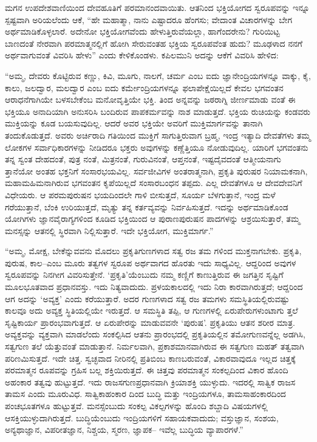 ಮಗನ ಉಪದೇಶವಾಣಿಯಿಂದ ದೇವಹೂತಿಗೆ ಪರಮಾನಂದವಾಯಿತು. ಆತನಿಂದ ಭಕ್ತಿಯೋಗದ ಸ್ವರೂಪವನ್ನು ಇನ್ನೂ ಸ್ಪಷ್ಟವಾಗಿ ಅರಿಯಲೆಂದು ಆಕೆ, “ಹೇ ಮಹಾತ್ಮಾ, ನಾನು ಎಷ್ಟಾದರೂ ಹೆಂಗಸು; ವೇದಾಂತ ವಿಚಾರಗಳನ್ನು ಬೇಗ ಅರ್ಥಮಾಡಿಕೊಳ್ಳಲಾರೆ. ಅದೇನೋ ಭಕ್ತಿಯೋಗವೆಂದು ಹೇಳುತ್ತಿರುವೆಯಲ್ಲಾ, ಹಾಗೆಂದರೇನು? ಗುರಿಯಿಟ್ಟ ಬಾಣದಂತೆ ನೇರವಾಗಿ ಪರಮಾತ್ಮನಲ್ಲಿಗೆ ಹೋಗಿ ಸೇರುವಂತಹ ಭಕ್ತಿಯ ಸ್ವರೂಪವೆಂತ ಹುದು? ಮೂಢಳಾದ ನನಗೆ ಅರ್ಥವಾಗುವಂತೆ ವಿವರಿಸಿ ಹೇಳು” ಎಂದು ಕೇಳಿಕೊಂಡಳು. ಕಪಿಲಮುನಿ ಅದನ್ನು ಆಕೆಗೆ ವಿವರಿಸಿ ಹೇಳಿದ:

“ಅಮ್ಮ, ದೇವರು ಕೊಟ್ಟಿರುವ ಕಣ್ಣು, ಕಿವಿ, ಮೂಗು, ನಾಲಗೆ, ಚರ್ಮ ಎಂಬ ಐದು ಜ್ಞಾನೇಂದ್ರಿಯಗಳನ್ನೂ ವಾಕ್ಕು, ಕೈ, ಕಾಲು, ಜಲದ್ವಾರ, ಮಲದ್ವಾರ ಎಂಬ ಐದು ಕರ್ಮೇಂದ್ರಿಯಗಳನ್ನೂ ಫಲಾಪೇಕ್ಷೆಯಿಲ್ಲದೆ ಕೇವಲ ಭಗವಂತನ ಆರಾಧನೆಗಾಗಿಯೇ ಬಳಸಬೇಕೆಂಬ ಮನೋವೃತ್ತಿಯೇ ಭಕ್ತಿ. ತಿಂದ ಅನ್ನವನ್ನು ಜಠರಾಗ್ನಿ ಜೀರ್ಣಮಾಡು ವಂತೆ ಈ ಭಕ್ತಿಯೂ ಅನಾದಿಯಾಗಿ ಅನುಸರಿಸಿ ಬಂದಿರುವ ಪಾಪಕರ್ಮವನ್ನು ನಾಶ ಮಾಡುತ್ತದೆ. ಭಕ್ತಿಯ ರುಚಿಯನ್ನು ಕಂಡವರು ಮುಕ್ತಿಯನ್ನು ಕೂಡ ಬಯಸುವುದಿಲ್ಲ. ಆದರೆ ಅವರ ಭಕ್ತಿಯೇ ಅವರಿಗೆ ಮುಕ್ತಿಮಾರ್ಗವನ್ನು ತಾನಾಗಿ ತಂದುಕೊಡುತ್ತದೆ. ಅವರು ಅರ್ಚಿರಾದಿ ಗತಿಯಿಂದ ಮುಕ್ತಿಗೆ ಸಾಗುತ್ತಿರುವಾಗ ಬ್ರಹ್ಮ, ಇಂದ್ರ ಇತ್ಯಾದಿ ದೇವತೆಗಳು ತಮ್ಮ ಲೋಕಗಳ ಸರ್ವಾಧಿಕಾರಗಳನ್ನು ನೀಡಿದರೂ ಭಕ್ತರು ಅವುಗಳನ್ನು ಕಣ್ಣೆತ್ತಿಯೂ ನೋಡುವುದಿಲ್ಲ. ಯಾರಿಗೆ ಭಗವಂತನು ತನ್ನ ಸ್ವಂತ ದೇಹದಂತೆ, ಪುತ್ರ ನಂತೆ, ಮಿತ್ರನಂತೆ, ಗುರುವಿನಂತೆ, ಆಪ್ತನಂತೆ, ಇಷ್ಟದೈವದಂತೆ ಆತ್ಮೀಯನಾಗು ತ್ತಾನೆಯೋ ಅಂತಹ ಭಕ್ತನಿಗೆ ಸಂಸಾರಭಯವಿಲ್ಲ. ಸರ್ವಜೀವಿಗಳ ಅಂತರಾತ್ಮನಾಗಿ, ಪ್ರಕೃತಿ ಪುರುಷರ ನಿಯಾಮಕನಾಗಿ, ಮಹಾಮಹಿಮನಾಗಿರುವ ಭಗವಂತನ ಕೃಪೆಯಿಲ್ಲದೆ ಸಂಸಾರಬಂಧನ ತಪ್ಪದು. ಎಲ್ಲ ದೇವತೆಗಳೂ ಆ ದೇವದೇವನಿಗೆ ವಿಧೇಯರು. ಆ ಪರಮಪುರುಷನ ಭಯದಿಂದಲೇ ಗಾಳಿ ಬೀಸುತ್ತದೆ, ಸೂರ್ಯ ಬೆಳಗುತ್ತಾನೆ, ಇಂದ್ರ ಮಳೆ ಗರೆಯುತ್ತಾನೆ, ಬೆಂಕಿ ಉರಿಯುತ್ತದೆ, ಮೃತ್ಯು ತನ್ನ ಕರ್ತವ್ಯವನ್ನು ನಿರ್ವಹಿಸುತ್ತದೆ. ಇದನ್ನು ಅರ್ಥಮಾಡಿಕೊಂಡ ಯೋಗಿಗಳು ಜ್ಞಾನವೈರಾಗ್ಯಗಳಿಂದ ಕೂಡಿದ ಭಕ್ತಿಯಿಂದ ಆ ಪುರಾಣಪುರುಷನ ಪಾದಗಳನ್ನು ಆಶ್ರಯಿಸುತ್ತಾರೆ, ತಮ್ಮ ಮನಸ್ಸನ್ನು ಆತನಲ್ಲಿ ಸ್ಥಿರವಾಗಿ ನಿಲ್ಲಿಸುತ್ತಾರೆ. ಇದೇ ಭಕ್ತಿಯೋಗ, ಮುಕ್ತಿಮಾರ್ಗ.”

“ಅಮ್ಮ, ಮೋಕ್ಷ, ಬೇಕೆನ್ನುವವನು ಮೊದಲು ಪ್ರಕೃತಿಗುಣಗಳಾದ ಸತ್ವ ರಜ ತಮ ಗಳಿಂದ ಮುಕ್ತನಾಗಬೇಕು. ಪ್ರಕೃತಿ, ಪುರುಷ, ಕಾಲ–ಎಂಬ ಮೂರು ತತ್ವಗಳ ಸ್ವರೂಪ ಅರ್ಥವಾಗದ ಹೊರತು ಇದು ಸಾಧ್ಯವಿಲ್ಲ. ಆದ್ದರಿಂದ ಅವುಗಳ ಸ್ವರೂಪವನ್ನು ನಿನಗೀಗ ವಿವರಿಸುತ್ತೇನೆ. ‘ಪ್ರಕೃತಿ’ಯೆಂಬುದು ನಮ್ಮ ಕಣ್ಣಿಗೆ ಕಾಣುತ್ತಿರುವ ಈ ಜಗತ್ತಿನ ಸೃಷ್ಟಿಗೆ ಮೂಲಭೂತವಾದ ಪ್ರಧಾನವಸ್ತು. ಇದು ನಿತ್ಯವಾದುದು. ಪ್ರಳಯಕಾಲದಲ್ಲಿ ಇದು ನಿರಾ ಕಾರವಾಗಿರುತ್ತದೆ; ಆದ್ದರಿಂದ ಆಗ ಅದನ್ನು ‘ಅವ್ಯಕ್ತ’ ಎಂದು ಕರೆಯುತ್ತಾರೆ. ಅದರ ಗುಣಗಳಾದ ಸತ್ವ ರಜ ತಮಗಳು ಸಮಸ್ಥಿತಿಯಲ್ಲಿರುವಷ್ಟು ಕಾಲವೂ ಅದು ಅವ್ಯಕ್ತ ಸ್ಥಿತಿಯಲ್ಲಿಯೇ ಇರುತ್ತದೆ. ಆ ಸಮಸ್ಥಿತಿ ತಪ್ಪಿ, ಆ ಗುಣಗಳಲ್ಲಿ ಏರುಪೇರುಗಳುಂಟಾಗು ತ್ತಲೆ ಸೃಷ್ಟಿಕಾರ್ಯ ಪ್ರಾರಂಭವಾಗುತ್ತದೆ. ಆ ಏರುಪೇರನ್ನು ಮಾಡುವವನೇ ‘ಪುರುಷ’. ಪ್ರಕೃತಿಯು ಆತನ ಶರೀರ ಮಾತ್ರ. ಅವ್ಯಕ್ತವನ್ನು ವ್ಯಕ್ತವಾಗಿ ಮಾಡಲೆಂದು ಸಂಕಲ್ಪಿಸಿದ ಆತನು ಪ್ರಾರಂಭದಲ್ಲಿ ಪ್ರಕೃತಿಯಲ್ಲಿನ ತಮೋಗುಣವನ್ನೆಲ್ಲ ಅಡಗಿಸಿ, ಸತ್ವಗುಣ ತಲೆ ಯೆತ್ತುವಂತೆ ಮಾಡುತ್ತಾನೆ. ನಿರ್ಮಲವಾಗಿ, ಪ್ರಕಾಶಮಾನವಾಗಿರುವ ಈ ಸತ್ವಗುಣ ಮಹತ್ ತತ್ವವಾಗಿ ಪರಿಣಮಿಸುತ್ತದೆ. ಇದೇ ಚಿತ್ತ. ಸ್ವಚ್ಛವಾದ ನೀರಿನಲ್ಲಿ ಪ್ರತಿಬಿಂಬ ಕಾಣಬರುವಂತೆ, ವಿಕಾರವಾವುದೂ ಇಲ್ಲದ ಚಿತ್ತಕ್ಕೆ ಪರಮಾತ್ಮನ ರೂಪವನ್ನು ಗ್ರಹಿಸ ಬಲ್ಲ ಶಕ್ತಿಯಿರುತ್ತದೆ. ಈ ಚಿತ್ತವು ಪರಮಾತ್ಮನ ಸಂಕಲ್ಪದಿಂದ ವಿಕಾರ ಹೊಂದಿ ಅಹಂಕಾರ ತತ್ವವು ಹುಟ್ಟುತ್ತದೆ. ಇದು ರಾಜಸಗುಣಪ್ರಧಾನವಾಗಿ ಕ್ರಿಯಾಶಕ್ತಿ ಯುಳ್ಳುದು. ಇದರಲ್ಲಿ ಸಾತ್ವಿಕ ರಾಜಸ ತಾಮಸ ಎಂದು ಮೂರುವಿಧ. ಸಾತ್ವಿಕಾಹಂಕಾರ ದಿಂದ ಬುದ್ಧಿ ಮತ್ತು ಇಂದ್ರಿಯಗಳೂ, ತಾಮಸಾಹಂಕಾರದಿಂದ ಪಂಚಭೂತಗಳೂ ಹುಟ್ಟುತ್ತವೆ. ಮನಸ್ಸೆಂಬುದು ಸಂಕಲ್ಪ ವಿಕಲ್ಪಗಳನ್ನು ಹೊಂದಿ ಶಬ್ದಾದಿ ವಿಷಯಗಳಲ್ಲಿ ಆಸಕ್ತಿಯುಳ್ಳುದಾಗಿರುತ್ತದೆ. ಬುದ್ಧಿಯೆಂಬುದು ಇಂದ್ರಿಯಗಳಿಗೆ ಸಹಾಯಕವಾದುದು; ವಸ್ತುಜ್ಞಾನ, ಸಂಶಯ, ಅನ್ಯಥಾಜ್ಞಾನ, ವಿಪರೀತಜ್ಞಾನ, ನಿಶ್ಚಯ, ಸ್ಮರಣ, ಜ್ಞಾಪಕ– ಇವೆಲ್ಲ ಬುದ್ಧಿಯ ವ್ಯಾಪಾರಗಳೆ.”

